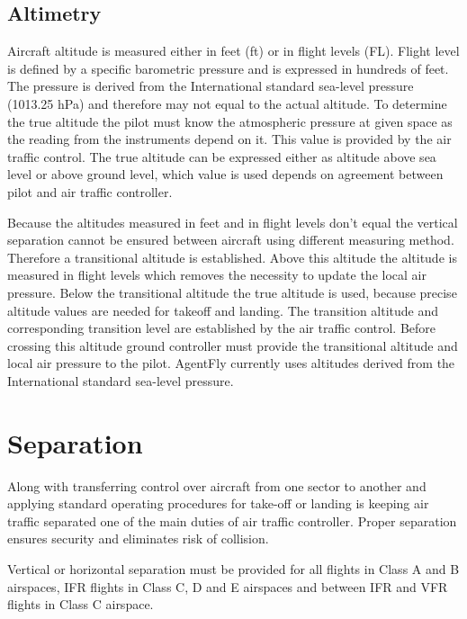 \subsection{Altimetry}

Aircraft altitude is measured either in feet (ft) or in flight levels (FL). Flight level is defined by a specific barometric pressure and is expressed in hundreds of feet. The pressure is derived from the International standard sea-level pressure (1013.25 hPa) and therefore may not equal to the actual altitude. To determine the true altitude the pilot must know the atmospheric pressure at given space as the reading from the instruments depend on it. This value is provided by the air traffic control. The true altitude can be expressed either as altitude above sea level or above ground level, which value is used depends on agreement between pilot and air traffic controller.

Because the altitudes measured in feet and in flight levels don't equal the vertical separation cannot be ensured between aircraft using different measuring method. Therefore a transitional altitude is established. Above this altitude the altitude is measured in flight levels which removes the necessity to update the local air pressure. Below the transitional altitude the true altitude is used, because precise altitude values are needed for takeoff and landing. The transition altitude and corresponding transition level are established by the air traffic control. Before crossing this altitude ground controller must provide the transitional altitude and local air pressure to the pilot. AgentFly currently uses altitudes derived from the International standard sea-level pressure.

\section{Separation}

Along with transferring control over aircraft from one sector to another and applying standard operating procedures for take-off or landing is keeping air traffic separated one of the main duties of air traffic controller. Proper separation ensures security and eliminates risk of collision. \cite[Chapter 2]{order7110}

Vertical or horizontal separation must be provided for all flights in Class A and B airspaces, IFR flights in Class C, D and E airspaces and between IFR and VFR flights in Class C airspace. \cite[Chapter 5]{doc4444}

